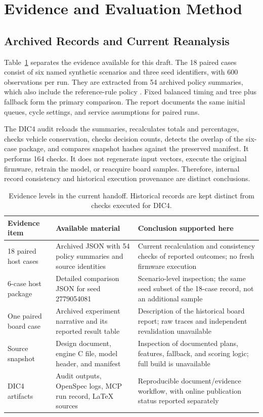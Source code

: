 \documentclass[conference]{IEEEtran}
\begin{document}
\section{Evidence and Evaluation Method}
\subsection{Archived Records and Current Reanalysis}
Table~\ref{tab:evidence} separates the evidence available for this draft. The 18 paired cases consist of six named synthetic scenarios and three seed identifiers, with 600 observations per run. They are extracted from 54 archived policy summaries, which also include the reference-rule policy \cite{projecthost}. Fixed balanced timing and tree plus fallback form the primary comparison. The report documents the same initial queues, cycle settings, and service assumptions for paired runs.

The DIC4 audit reloads the summaries, recalculates totals and percentages, checks vehicle conservation, checks decision counts, detects the overlap of the six-case package, and compares snapshot hashes against the preserved manifest. It performs 164 checks. It does not regenerate input vectors, execute the original firmware, retrain the model, or reacquire board samples. Therefore, internal record consistency and historical execution provenance are distinct conclusions.

\begin{table}[t]
\caption{Evidence levels in the current handoff. Historical records are kept distinct from checks executed for DIC4.}
\label{tab:evidence}
\centering\small
\begin{tabular}{p{}p{}p{}}
\toprule
Evidence item & Available material & Conclusion supported here\\
\midrule
18 paired host cases & Archived JSON with 54 policy summaries and source identities & Current recalculation and consistency checks of reported outcomes; no fresh firmware execution\\
6-case host package & Detailed comparison JSON for seed 2779054081 & Scenario-level inspection; the same seed subset of the 18-case record, not an additional sample\\
One paired board case & Archived experiment narrative and its reported result table & Description of the historical board report; raw traces and independent revalidation unavailable\\
Source snapshot & Design document, engine C file, model header, and manifest & Inspection of documented plans, features, fallback, and scoring logic; full build is unavailable\\
DIC4 artifacts & Audit outputs, OpenSpec logs, MCP run record, LaTeX sources & Reproducible document/evidence workflow, with online publication status reported separately\\
\bottomrule
\end{tabular}
\end{table}
\end{document}
